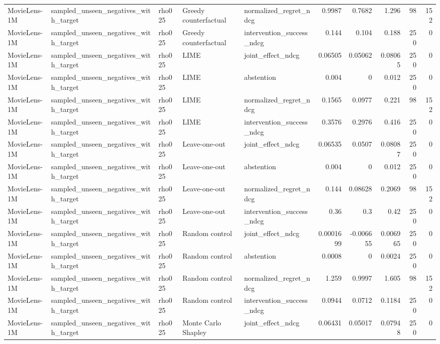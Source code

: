 \begin{table}[t]
{\begin{tabular}{lllllrrrrr}
MovieLens-1M & sampled\_unseen\_negatives\_with\_target & rho025 & Greedy counterfactual & normalized\_regret\_ndcg & 0.9987 & 0.7682 & 1.296 & 98 & 152 \\
MovieLens-1M & sampled\_unseen\_negatives\_with\_target & rho025 & Greedy counterfactual & intervention\_success\_ndcg & 0.144 & 0.104 & 0.188 & 250 & 0 \\
MovieLens-1M & sampled\_unseen\_negatives\_with\_target & rho025 & LIME & joint\_effect\_ndcg & 0.06505 & 0.05062 & 0.08065 & 250 & 0 \\
MovieLens-1M & sampled\_unseen\_negatives\_with\_target & rho025 & LIME & abstention & 0.004 & 0 & 0.012 & 250 & 0 \\
MovieLens-1M & sampled\_unseen\_negatives\_with\_target & rho025 & LIME & normalized\_regret\_ndcg & 0.1565 & 0.0977 & 0.221 & 98 & 152 \\
MovieLens-1M & sampled\_unseen\_negatives\_with\_target & rho025 & LIME & intervention\_success\_ndcg & 0.3576 & 0.2976 & 0.416 & 250 & 0 \\
MovieLens-1M & sampled\_unseen\_negatives\_with\_target & rho025 & Leave-one-out & joint\_effect\_ndcg & 0.06535 & 0.0507 & 0.08087 & 250 & 0 \\
MovieLens-1M & sampled\_unseen\_negatives\_with\_target & rho025 & Leave-one-out & abstention & 0.004 & 0 & 0.012 & 250 & 0 \\
MovieLens-1M & sampled\_unseen\_negatives\_with\_target & rho025 & Leave-one-out & normalized\_regret\_ndcg & 0.144 & 0.08628 & 0.2069 & 98 & 152 \\
MovieLens-1M & sampled\_unseen\_negatives\_with\_target & rho025 & Leave-one-out & intervention\_success\_ndcg & 0.36 & 0.3 & 0.42 & 250 & 0 \\
MovieLens-1M & sampled\_unseen\_negatives\_with\_target & rho025 & Random control & joint\_effect\_ndcg & 0.0001699 & -0.006655 & 0.006965 & 250 & 0 \\
MovieLens-1M & sampled\_unseen\_negatives\_with\_target & rho025 & Random control & abstention & 0.0008 & 0 & 0.0024 & 250 & 0 \\
MovieLens-1M & sampled\_unseen\_negatives\_with\_target & rho025 & Random control & normalized\_regret\_ndcg & 1.259 & 0.9997 & 1.605 & 98 & 152 \\
MovieLens-1M & sampled\_unseen\_negatives\_with\_target & rho025 & Random control & intervention\_success\_ndcg & 0.0944 & 0.0712 & 0.1184 & 250 & 0 \\
MovieLens-1M & sampled\_unseen\_negatives\_with\_target & rho025 & Monte Carlo Shapley & joint\_effect\_ndcg & 0.06431 & 0.05017 & 0.07948 & 250 & 0 \\

\end{tabular}}
\end{table}
